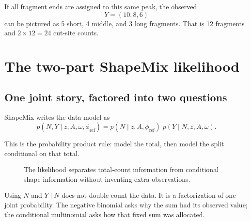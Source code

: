 \documentclass[11pt]{article}
\newcommand{\NB}{\operatorname{NegBinomial}}
\newcommand{\Mult}{\operatorname{Multinomial}}
\begin{document}
If all fragment ends are assigned to this same peak, the observed
\[
Y=(10,8,6)
\]
can be pictured as 5 short, 4 middle, and 3 long fragments. That is 12 fragments
and \(2\times12=24\) cut-site counts.

\section{The two-part ShapeMix likelihood}

\subsection{One joint story, factored into two questions}

ShapeMix writes the data model as
\[
\boxed{
p(N,Y\mid z,A,\omega,\phi_{\mathrm{ref}})
=
p(N\mid z,A,\phi_{\mathrm{ref}})
\;p(Y\mid N,z,A,\omega).
}
\]

This is the probability product rule: model the total, then model the split
conditional on that total.

\begin{figure}[H]
\centering
{}
\caption{The likelihood separates total-count information from conditional shape information without inventing extra observations.}
\end{figure}

\begin{watchout}
Using \(N\) and \(Y\mid N\) does not double-count the data. It is a factorization
of one joint probability. The negative binomial asks why the sum had its observed
value; the conditional multinomial asks how that fixed sum was allocated.
\end{watchout}
\end{document}
